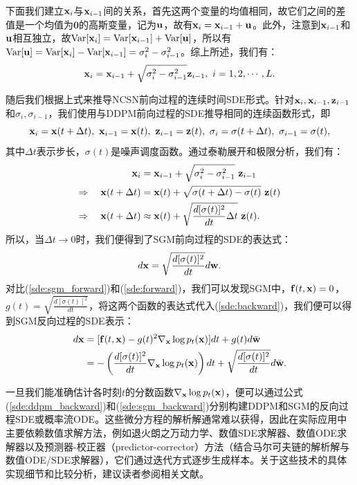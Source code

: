 \documentclass[11pt,a4paper,UTF8]{ctexart}
\begin{document}
下面我们建立$\mathbf{x}_i$与$\mathbf{x}_{i-1}$间的关系，首先这两个变量的均值相同，故它们之间的差值是一个均值为$\mathbf{0}$的高斯变量，记为$\mathbf{u}$，故有$\mathbf{x}_i=\mathbf{x}_{i-1}+\mathbf{u}$。此外，注意到$\mathbf{x}_{i-1}$和$\mathbf{u}$相互独立，故$\text{Var}[\mathbf{x}_i]=\text{Var}[\mathbf{x}_{i-1}]+\text{Var}[\mathbf{u}]$，所以有$\text{Var}[\mathbf{u}]=\text{Var}[\mathbf{x}_i]-\text{Var}[\mathbf{x}_{i-1}]=\sigma_i^2-\sigma_{i-1}^2$。综上所述，我们有：
\begin{equation*}
    \mathbf{x}_i = \mathbf{x}_{i-1} + \sqrt{\sigma_i^2-\sigma_{i-1}^2} \mathbf{z}_{i-1},\ i=1,2,\cdots,L.
\end{equation*}

随后我们根据上式来推导NCSN前向过程的连续时间SDE形式。针对$\mathbf{x}_i,\mathbf{x}_{i-1},\mathbf{z}_{i-1}$和$\sigma_i,\sigma_{i-1}$，我们使用与DDPM前向过程的SDE推导相同的连续函数形式，即
\begin{equation*}
    \x_i=\x(t+\Delta t),\ \x_{i-1}=\x(t),\ \z_{i-1}=\z(t),\ \sigma_i = \sigma(t+\Delta t),\ \sigma_{i-1} = \sigma(t),
\end{equation*}
其中$\Delta t$表示步长，$\sigma(t)$是噪声调度函数。通过泰勒展开和极限分析，我们有：
\begin{align*}
    \mathbf{x}_i &= \mathbf{x}_{i-1} + \sqrt{\sigma_i^2-\sigma_{i-1}^2}\ \mathbf{z}_{i-1} \\
    \Rightarrow\quad \mathbf{x}(t+\Delta t) &=\mathbf{x}(t) + \sqrt{\sigma(t+\Delta t) -\sigma(t)}\ \mathbf{z}(t) \\
    \Rightarrow\quad \mathbf{x}(t+\Delta t) &\approx \mathbf{x}(t) + \sqrt{\frac{d[\sigma(t)]^2}{dt}\Delta t}\ \mathbf{z}(t).
\end{align*}
所以，当$\Delta t\rightarrow 0$时，我们便得到了SGM前向过程的SDE的表达式：
\begin{equation}
    d\mathbf{x} = \sqrt{\frac{d[\sigma(t)]^2}{dt}}d\mathbf{w}.
\label{sde:sgm_forward}
\end{equation}
对比(\ref{sde:sgm_forward})和(\ref{sde:forward})，我们可以发现SGM中，$\mathbf{f}(t,\mathbf{x})=0$，$g(t)=\sqrt{\frac{d[\sigma(t)]^2}{dt}}$，将这两个函数的表达式代入(\ref{sde:backward})，我们便可以得到SGM反向过程的SDE表示：
\begin{align}
\begin{split}
    d\mathbf{x} &= [\mathbf{f}(t,\mathbf{x}) - g(t)^2 \nabla_{\mathbf{x}} \log p_t(\mathbf{x}) ]dt + g(t)d\bar{\mathbf{w}} \\
    &= -\left(\frac{d[\sigma(t)]^2}{dt} \nabla_{\mathbf{x}} \log p_t(\mathbf{x}) \right)dt + \sqrt{\frac{d[\sigma(t)]^2}{dt}} d\bar{\mathbf{w}}.
\end{split} 
\label{sde:sgm_backward}
\end{align}

一旦我们能准确估计各时刻$t$的分数函数$\nabla_{\mathbf{x}}\log p_t(\mathbf{x})$，便可以通过公式(\ref{sde:ddpm_backward})和(\ref{sde:sgm_backward})分别构建DDPM和SGM的反向过程SDE或概率流ODE。这些微分方程的解析解通常难以获得，因此在实际应用中主要依赖数值求解方法，例如退火朗之万动力学\cite{song2019generative}、数值SDE求解器\cite{jolicoeur2021gotta,song2020score}、数值ODE求解器\cite{karras2022elucidating,lu2022dpm,song2020denoising,song2020score}以及预测器-校正器（predictor-corrector）方法（结合马尔可夫链的解析解与数值ODE/SDE求解器）\cite{song2020score}，它们通过迭代方式逐步生成样本。关于这些技术的具体实现细节和比较分析，建议读者参阅相关文献。
\end{document}
